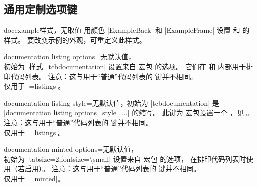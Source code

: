 \clearpage
\subsection{通用定制选项键}

\begin{docTcbKey}[][doc updated=2015-03-16]{docexample}{}{样式，无取值}
  用颜色 |ExampleBack| 和 |ExampleFrame| 设置 
  和  的样式。
  要改变示例的外观，可重定义此样式。
\begin{dispListing}
\end{dispListing}
\end{docTcbKey}

\begin{docTcbKey}{documentation listing options}{=}{无默认值，\\\hspace*{\fill} 初始为 |样式=tcbdocumentation|}
  设置来自  宏包 \cite{hoffmann:listings} 的选项。
  它们在  和  内部用于排印代码列表。
  注意：这与用于\enquote{普通}代码列表的  键并不相同。\\
  仅用于 |=listings|。
\end{docTcbKey}

\begin{docTcbKey}{documentation listing style}{=}{无默认值，初始为 |tcbdocumentation|}
  是 |documentation listing options={style=...}| 的缩写。
  此键为  宏包设置一个 ，见 \cite{hoffmann:listings}。
  注意：这与用于\enquote{普通}代码列表的  键并不相同。\\
  仅用于 |=listings|。
\end{docTcbKey}

\begin{docTcbKey}{documentation minted options}{=}{无默认值，\\\hspace*{\fill} 初始为 |tabsize=2,fontsize=\textbackslash small|}
  设置来自  宏包 \cite{poore:minted} 的选项，
  在排印代码列表时使用（若启用）。
  注意：这与用于\enquote{普通}代码列表的  键并不相同。\\
  仅用于 |=minted|。
\end{docTcbKey}

